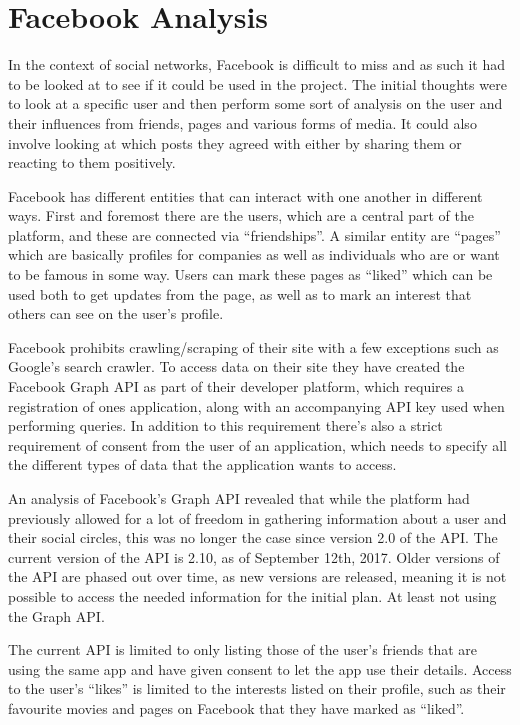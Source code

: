 \chapter{Facebook Analysis}\label{chap:facebook-analysis}

In the context of social networks, Facebook is difficult to miss\citep{FacebookPopularity} and as
such it had to be looked at to see if it could be used in the project.
The initial thoughts were to look at a specific user and then perform some sort of analysis on the user and their
influences from friends, pages and various forms of media.
It could also involve looking at which posts they agreed with either by sharing them or reacting to them positively.

\nl
Facebook has different entities that can interact with one another in different ways.
First and foremost there are the users, which are a central part of the platform, and these are connected via
``friendships''.
A similar entity are ``pages'' which are basically profiles for companies as well as individuals who are or want to be
famous in some way.
Users can mark these pages as ``liked'' which can be used both to get updates from the page, as well as to mark an
interest that others can see on the user's profile.

\nl
Facebook prohibits crawling/scraping of their site with a few exceptions such as Google's search crawler.
To access data on their site they have created the Facebook Graph API as part of their developer platform, which
requires a registration of ones application, along with an accompanying API key used when performing queries.
In addition to this requirement there's also a strict requirement of consent from the user of an application, which
needs to specify all the different types of data that the application wants to access.

\nl
An analysis of Facebook's Graph API revealed that while the platform had previously allowed for a lot of freedom in
gathering information about a user and their social circles, this was no longer the case since version 2.0 of the API.
The current version of the API is 2.10, as of September 12th, 2017.
Older versions of the API are phased out over time, as new versions are released, meaning it is not possible to access
the needed information for the initial plan.
At least not using the Graph API.

\nl
The current API is limited to only listing those of the user's friends that are using the same app and have given
consent to let the app use their details.
Access to the user's ``likes'' is limited to the interests listed on their profile, such as their favourite movies and
pages on Facebook that they have marked as ``liked''.

